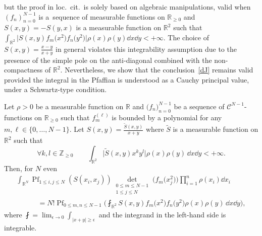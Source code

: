 but the proof in loc.\ cit.\ is solely based on algebraic manipulations, valid when $(f_n)_{n = 0}^{N - 1}$ is a~sequence of measurable functions on $\mathbb{R}_{\geq 0}$ and $S(x,y) = -S(y,x)$ is a measurable function on $\mathbb{R}^2$ such that $\int_{\mathbb{R}^2} \big|S(x,y)f_m\bigl(x^2\bigr)f_n\bigl(y^2\bigr)\big|\rho(x)\rho(y)\dd x\dd y < +\infty$. The choice of $S(x,y) = \frac{x - y}{x + y}$ in general violates this integrability assumption due to the presence of the simple pole on the anti-diagonal combined with the non-compactness of $\mathbb{R}^2$. Nevertheless, we show that the conclusion~\eqref{dJ} remains valid provided the integral in the Pfaffian is understood as a Cauchy principal value, under a Schwartz-type condition.

\begin{Lemma}
\label{HUHH}Let $\rho > 0$ be a measurable function on $\mathbb{R}$ and $\mathbb(f_n)_{n = 0}^{N - 1}$ be a sequence of $\mathcal{C}^{N - 1}$-functions on $\mathbb{R}_{\geq 0}$ such that $f^{(\ell)}_m$ is bounded by a polynomial for any $m,\ell \in \{0,\dots,N - 1\}$. Let $S(x,y) = \frac{\tilde{S}(x,y)}{x + y}$ where $\tilde{S}$ is a measurable function on $\mathbb{R}^2$ such that
\[
\forall k,l \in \mathbb{Z}_{\geq 0}\qquad \int_{\mathbb{R}^2} \bigl|\tilde{S}(x,y)x^ky^l\bigr|\rho(x)\rho(y)\,\dd x \dd y < +\infty.
\]
Then, for $N$ even
\begin{gather*}
 \int_{\mathbb{R}^N} \operatorname{Pf}_{1 \leq i,j \leq N} (S(x_i,x_j)) \mathop{\det}_{\substack{0 \leq m \leq N - 1 \\
 1 \leq j \leq N}} \bigl(f_m\bigl(x_j^2\bigr)\bigr) \prod_{i = 1}^n \rho(x_i)\dd x_i \\
\qquad\quad{} = N!\operatorname{Pf}_{0 \leq m,n \leq N - 1}\biggl(\fint_{\mathbb{R}^2} S(x,y) f_m\bigl(x^2\bigr) f_n\bigl(y^2\bigr)\rho(x)\rho(y)\,\dd x \dd y\biggr),
\end{gather*}
where $\fint = \lim_{\epsilon \rightarrow 0} \int_{|x + y| \geq \epsilon}$ and the integrand in the left-hand side is integrable.
\end{Lemma}
